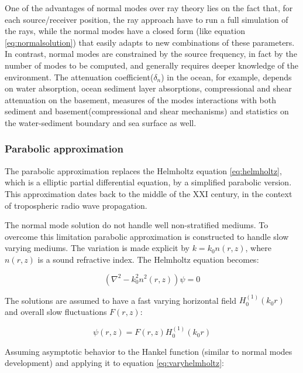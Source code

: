 One of the advantages of normal modes over ray theory lies on the fact that, for
each source/receiver position, the ray approach have to run a full simulation of
the rays, while the normal modes have a closed form (like equation
\ref{eq:normalsolution}) that easily adapts to new combinations of these
parameters. In contrast, normal modes are constrained by the source frequency,
in fact by the number of modes to be computed, and generally requires deeper
knowledge of the environment. The attenuation
coefficient($\delta_n$) in the ocean, for example, depends on water absorption,
ocean sediment layer absorptions, compressional and shear attenuation on the
basement, measures of the modes interactions with both sediment and
basement(compressional and shear mechanisms) and statistics on the
water-sediment boundary and sea surface as well.

\subsubsection{Parabolic approximation}

The parabolic approximation replaces the Helmholtz equation \ref{eq:helmholtz},
which is a elliptic partial differential equation, by a simplified parabolic
version. This approximation dates back to the middle of the $\mathrm{XXI}$
century, in the context of tropospheric radio wave propagation.

The normal mode solution do not handle well non-stratified mediums. To overcome
this limitation parabolic approximation is constructed to handle slow varying
mediums. The variation is made explicit by $k = k_0n(r,z)$, where $n(r,z)$ is a
sound refractive index\cite{LURTON}. The Helmholtz equation becomes:

\begin{equation}
\label{eq:varyhelmholtz}
(\nabla^2 - k_0^2n^2(r,z))\psi = 0 
\end{equation}

The solutions are assumed to have a fast varying horizontal field
$H_0^{(1)}(k_0r)$ and overall slow fluctuations $F(r,z)$:

\begin{equation*}
\psi(r,z) = F(r,z)H_0^{(1)}(k_0r)
\end{equation*}

Assuming asymptotic behavior to the Hankel function (similar to normal modes
development) and applying it to equation \ref{eq:varyhelmholtz}:


